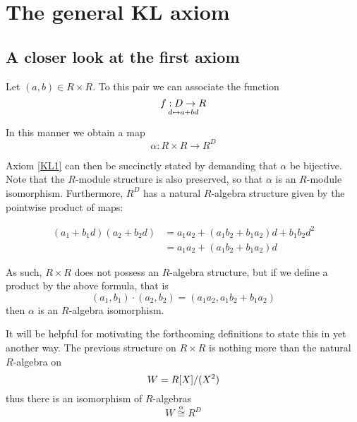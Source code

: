 \chapter{The general KL axiom} \label{sec:genkl}

\section{A closer look at the first axiom} \label{ax1re}

Let \( (a,b)\in R\times R \). To this pair we can associate the function
\begin{equation*}
  f:D\to R
  \atop
  d\mapsto a + bd
\end{equation*}

In this manner we obtain a map
\begin{equation*}
  \alpha : R\times R\to R^D
\end{equation*}

Axiom \ref{KL1} can then be succinctly stated by demanding that \( \alpha \) be bijective. Note that the \( R \)-module structure is also preserved, so that \( \alpha \) is an \( R \)-module isomorphism. Furthermore, \( R^D \) has a natural \( R \)-algebra structure given by the pointwise product of maps:

\begin{align}
  (a_1 + b_1d)(a_2 + b_2d) & = a_1a_2 + (a_1b_2 + b_1a_2)d + b_1b_2d^2 \\
                           & = a_1a_2 + (a_1b_2 + b_1a_2)d
  \label{R-alg}
\end{align}

As such, \( R\times R \) does not possess an \( R \)-algebra structure, but if we define a product by the above formula, that is
\begin{equation*}
  (a_1,b_1)\cdot(a_2,b_2) = (a_1a_2,a_1b_2 + b_1a_2)
\end{equation*}
then \( \alpha  \) is an \( R \)-algebra isomorphism.

It will be helpful for motivating the forthcoming definitions to state this in yet another way. The previous structure on \( R\times R \) is nothing more than the natural \( R \)-algebra on
\begin{equation*}
  W = R[X]/(X^2)
\end{equation*}
thus there is an isomorphism of \( R \)-algebras
\begin{equation*}
  W \stackrel{\alpha}{\cong} R^D
\end{equation*}

